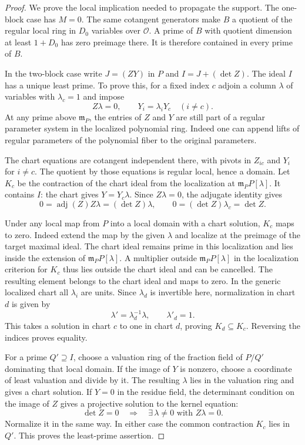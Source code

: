 \begin{proof}
We prove the local implication needed to propagate
the support. The one-block case has \(M=0\).
The same cotangent generators make \(B\) a quotient
of the regular local ring in \(D_0\) variables over
\(\mathcal O\). A prime of \(B\) with quotient dimension
at least \(1+D_0\) has zero preimage there. It is therefore
contained in every prime of \(B\).

In the two-block case write \(J=(ZY)\) in \(P\) and
\(I=J+(\det Z)\). The ideal \(I\) has a unique least
prime. To prove this, for a fixed index \(c\) adjoin
a column \(\lambda\) of variables with \(\lambda_c=1\)
and impose
\[
              Z\lambda=0,\qquad
              Y_i=\lambda_iY_c\quad(i\ne c).
\]
At any prime above \(\mathfrak m_P\), the entries of
\(Z\) and \(Y\) are still part of a regular parameter
system in the localized polynomial ring. Indeed one
can append lifts of regular parameters of the polynomial
fiber to the original parameters.

The chart equations
are cotangent independent there, with pivots in
\(Z_{ic}\) and \(Y_i\) for \(i\ne c\).
The quotient by those equations is regular local,
hence a domain. Let \(K_c\) be the contraction of
the chart ideal from the localization at
\(\mathfrak m_P P[\lambda]\). It contains \(I\):
the chart gives \(Y=Y_c\lambda\). Since \(Z\lambda=0\), the
adjugate identity gives
\[
 0=\operatorname{adj}(Z) Z\lambda=(\det Z)\lambda,\qquad
 0=(\det Z)\lambda_c=\det Z .
\]

Under any local map from \(P\) into a local domain
with a chart solution, \(K_c\) maps to zero.
Indeed extend the map by the given \(\lambda\) and
localize at the preimage of the target maximal ideal.
The chart ideal remains prime in this localization
and lies inside the extension of
\(\mathfrak m_P P[\lambda]\). A multiplier outside
\(\mathfrak m_P P[\lambda]\) in the localization criterion for
\(K_c\) thus lies outside the chart ideal and can be
cancelled. The resulting element belongs to the
chart ideal and maps to zero. In the generic
localized chart all \(\lambda_i\) are units.
Since \(\lambda_d\) is invertible here, normalization in chart \(d\) is given by
\[
 \lambda' = \lambda_d^{-1}\lambda,\qquad \lambda'_d=1.
\]
This takes a solution in chart \(c\) to one in chart \(d\), proving \(K_d\subseteq K_c\).
Reversing the indices proves equality.

For a prime \(Q'\supseteq I\), choose a valuation ring
of the fraction field of \(P/Q'\) dominating that local
domain. If the image of \(Y\) is nonzero, choose a
coordinate of least valuation and divide by it.
The resulting \(\lambda\) lies in the valuation ring
and gives a chart solution. If \(Y=0\) in the residue field, the determinant condition on the image of \(Z\) gives a projective solution to the kernel equation:
\[
 \det Z=0\quad\Longrightarrow\quad \exists\,\lambda\ne0\text{ with }Z\lambda=0 .
\] Normalize it in the
same way. In either case the common contraction
\(K_c\) lies in \(Q'\). This proves the least-prime
assertion.


\end{proof}
